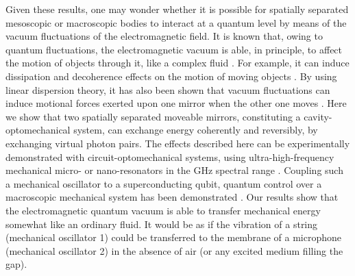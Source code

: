 \documentclass[aps,pra,twocolumn,floatfix,longbibliography, superscriptaddress]{revtex4-1}
\begin{document}
	
	Given these results, one may wonder
	 whether  it is possible for spatially separated mesoscopic or macroscopic bodies to interact at a quantum level by means of the vacuum fluctuations of the electromagnetic field. 
	It is known that, owing to quantum fluctuations, the electromagnetic vacuum is able, in principle, to affect the motion of objects through it, like a complex fluid \cite{Kardar1999}. For example, it can induce dissipation and decoherence effects  on the motion of moving objects \cite{Dalvit2000,Jaekel1992a}.
	By using linear dispersion theory, it has also been shown that vacuum fluctuations can induce motional forces exerted upon one mirror when the other one moves \cite{Jaekel1992b}. 
	Here we show that two spatially separated moveable mirrors, constituting a cavity-optomechanical system, can exchange energy coherently and reversibly, by exchanging virtual photon pairs. The effects described here can be experimentally demonstrated with circuit-optomechanical systems, using ultra-high-frequency mechanical micro- or nano-resonators in the GHz spectral range \cite{OConnell2010, Rouxinol2016}. Coupling such a mechanical oscillator to a superconducting qubit, quantum control over a macroscopic mechanical system has been demonstrated \cite{OConnell2010}. 
	Our results show that the electromagnetic quantum vacuum is able to transfer mechanical energy somewhat like an ordinary fluid.  It would be as if the vibration of a string (mechanical oscillator 1) could be transferred to the membrane of a microphone (mechanical oscillator 2) in the absence of air (or any excited medium filling the gap). 
	
\end{document}
